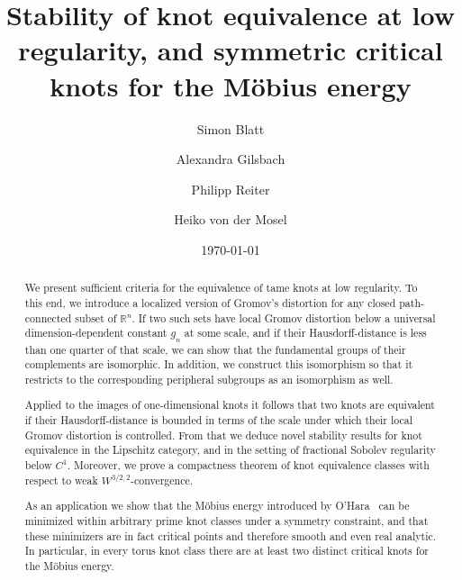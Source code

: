 \documentclass[a4paper,12pt,intlimits,ngerman]{amsart}
\title[Stability of knot equivalence and symmetric critical knots]
{Stability of knot equivalence at low regularity, 
and symmetric critical knots for the M\"obius energy}
\author{
Simon Blatt}
\author{Alexandra Gilsbach}
\author{Philipp Reiter}
\author{Heiko von der Mosel}
\date{\today}
\numberwithin{equation}{section}
\newcommand{\R}{\mathbb{R}}
\begin{document}
\begin{abstract}
We present 
sufficient criteria for the equivalence of tame knots at low regularity.
To this end, we introduce a localized version of Gromov's distortion
for any closed path-connected subset of $\R^n$. If two such sets have
local Gromov distortion
below a universal dimension-dependent constant $g_n$ at some scale, and if their
Hausdorff-distance is less than one quarter of that scale, 
we can show
that the fundamental groups of their complements are isomorphic. 
In addition, we construct this
isomorphism so that it restricts to the corresponding
peripheral subgroups as an isomorphism as well.

Applied to the images of one-dimensional knots
it follows that two knots are equivalent if their Hausdorff-distance
is bounded in terms of the scale under which their local 
Gromov distortion is controlled. From that we deduce
novel stability results for knot
equivalence in the Lipschitz category, and in the setting of fractional
Sobolev regularity below $C^1$. Moreover,
we prove a compactness theorem of knot equivalence classes
with respect to weak $W^{3/2,2}$-convergence.

As an application we show that the M\"obius energy introduced by 
O'Hara~\cite{ohara_1991a} can be minimized within arbitrary
prime knot 
classes under a symmetry constraint, and 
that these minimizers are in fact critical points and therefore
smooth and even
real analytic.  In particular, in every torus knot class there are at
least two distinct critical knots for the M\"obius energy.
\end{abstract}

\maketitle

\tableofcontents















\end{document}
